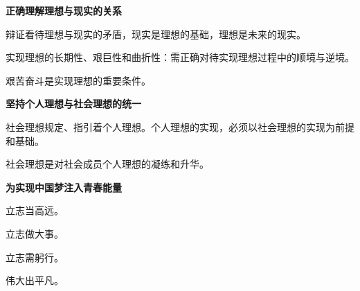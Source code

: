 \textbf{{正确理解理想与现实的关系}}

{{辩证看待理想与现实的矛盾}}{，现实是理想的基础，理想是未来的现实。}

{{实现理想的}{长期性、艰巨性和曲折性}}{：需正确对待实现理想过程中的顺境与逆境。}

{艰苦奋斗是实现理想的重要条件。}

\textbf{{坚持个人理想与社会理想的统一}}

{社会理想规定、指引着个人理想。个人理想的实现，必须以社会理想的实现为前提和基础。}

{社会理想是对社会成员个人理想的凝练和升华。}

{\textbf{为实现中国梦注入青春能量}}

{立志当高远。}

{立志做大事。}

{立志需躬行。}

{伟大出平凡。}

